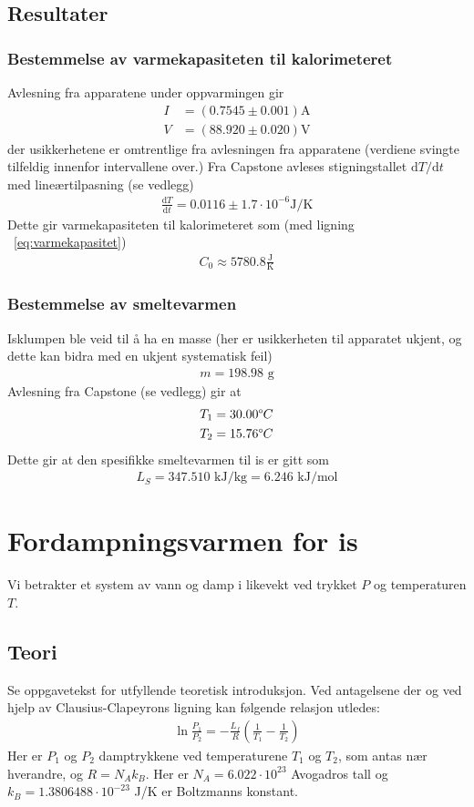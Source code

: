 \documentclass[aps,reprint]{revtex4-1}
\begin{document}
\subsection{Resultater}
\subsubsection{Bestemmelse av varmekapasiteten til kalorimeteret}
Avlesning fra apparatene under oppvarmingen gir
\begin{align*}
  I &= (0.7545 \pm 0.001) \text{A} \\
  V &= (88.920 \pm 0.020) \text{V}
\end{align*}
der usikkerhetene er omtrentlige fra avlesningen fra apparatene (verdiene
svingte tilfeldig innenfor intervallene over.) Fra Capstone avleses stigningstallet $\text{d}T/\text{d}t$
med lineærtilpasning (se vedlegg)
\begin{align*}
  \frac{\text{d}T}{\text{d}t} = 0.0116 \pm 1.7 \cdot 10^{-6} \text{J/K}
\end{align*}
Dette gir varmekapasiteten til kalorimeteret som (med ligning ~\ref{eq:varmekapasitet})
\begin{align}
  C_0 \approx 5780.8 \frac{\text{J}}{\text{K}}
\end{align}
\subsubsection{Bestemmelse av smeltevarmen}
\noindent
Isklumpen ble veid til å ha en masse (her er usikkerheten til apparatet ukjent,
og dette kan bidra med en ukjent systematisk feil)
\begin{align*}
  m = 198.98 \text{ g}
\end{align*}
Avlesning fra Capstone (se vedlegg) gir at
\begin{align*}
  T_1 = 30.00 \degree C\\
  T_2 = 15.76 \degree C
\end{align*}
Dette gir at den spesifikke smeltevarmen til is er gitt som
\begin{align}
  L_S = 347.510 \text{ kJ/kg} = 6.246 \text{ kJ/mol}
\end{align}
\section{Fordampningsvarmen for is}
Vi betrakter et system av vann og damp i likevekt ved trykket $P$ og temperaturen
$T$.
\subsection{Teori}
Se oppgavetekst for utfyllende teoretisk introduksjon. Ved antagelsene der og ved hjelp
av Clausius-Clapeyrons ligning kan følgende relasjon utledes:
\begin{align}
  \label{eq:claus}
  \ln{\frac{P_1}{P_2}} = - \frac{L_f}{R}\left( \frac{1}{T_1} - \frac{1}{T_2} \right)
\end{align}
Her er $P_1$ og $P_2$ damptrykkene ved temperaturene $T_1$ og $T_2$, som antas
nær hverandre, og $R = N_A k_B$. Her er $N_A = 6.022 \cdot 10^{23}$ Avogadros
tall og $k_B = 1.3806488 \cdot 10^{-23}$ J/K er Boltzmanns konstant.
\end{document}

